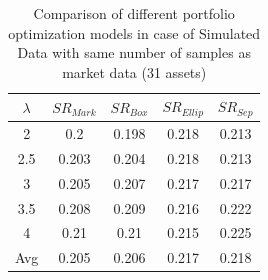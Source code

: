 \begin{table}[!h]
    \centering
    \captionsetup{justification=centering}
   \begin{tabular}{||c|c|c|c|c||}
   \hline
  
  
  $\lambda$ & $SR_{Mark}$ & $SR_{Box}$ & $SR_{Ellip}$ & $SR_{Sep}$ \\
  
  \hline
 2 & 0.2 & 0.198 & 0.218 & 0.213 \\
 2.5 & 0.203 & 0.204 & 0.218 & 0.213 \\
 3 & 0.205 & 0.207 & 0.217 & 0.217 \\
 3.5 & 0.208 & 0.209 & 0.216 & 0.222 \\
 4 & 0.21 & 0.21 & 0.215 & 0.225 \\
  \hline
  Avg & 0.205 & 0.206 & 0.217 & 0.218 \\
  \hline

\end{tabular}
    \caption{Comparison of different portfolio optimization models in case of Simulated Data with same number of samples as market data (31 assets)}
    \label{tab:2}
\end{table}

